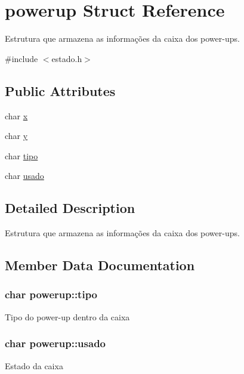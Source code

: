 \hypertarget{structpowerup}{}\section{powerup Struct Reference}
\label{structpowerup}


Estrutura que armazena as informações da caixa dos power-\/ups.  




{\ttfamily \#include $<$estado.\+h$>$}

\subsection*{Public Attributes}
\begin{DoxyCompactItemize}
\item 
char \hyperlink{structpowerup_a69ca024006b9be4276b9dcc238e44cfe}{x}
\item 
char \hyperlink{structpowerup_a4025da7ede0b755cc723310e77fd0c00}{y}
\item 
char \hyperlink{structpowerup_a4e8cad1f4f563141651d8b5f9f686609}{tipo}
\item 
char \hyperlink{structpowerup_a0a2cd4bf32b6862c3bc84f727500cda4}{usado}
\end{DoxyCompactItemize}


\subsection{Detailed Description}
Estrutura que armazena as informações da caixa dos power-\/ups. 

\subsection{Member Data Documentation}
\subsubsection[{\texorpdfstring{tipo}{tipo}}]{\setlength{\rightskip}{0pt plus 5cm}char powerup\+::tipo}\hypertarget{structpowerup_a4e8cad1f4f563141651d8b5f9f686609}{}\label{structpowerup_a4e8cad1f4f563141651d8b5f9f686609}
Tipo do power-\/up dentro da caixa 
\subsubsection[{\texorpdfstring{usado}{usado}}]{\setlength{\rightskip}{0pt plus 5cm}char powerup\+::usado}\hypertarget{structpowerup_a0a2cd4bf32b6862c3bc84f727500cda4}{}\label{structpowerup_a0a2cd4bf32b6862c3bc84f727500cda4}
Estado da caixa 
